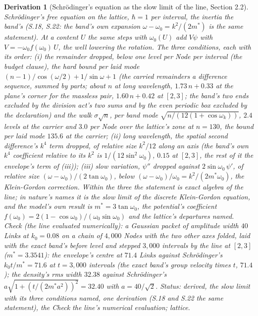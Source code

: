 \documentclass[pdflatex,sn-mathphys-num]{sn-jnl}
\theoremstyle{thmstyleone}
\newtheorem{derivation}{Derivation}
\begin{document}
\begin{derivation}[Schr\"odinger's equation as the slow limit of the line, Section 2.2]
Schr\"odinger's free equation on the lattice, $\hbar = 1$ per interval, the inertia the band's (S.18, S.22: the band's own expansion $\omega - \omega_0 = k^2 / (2m^*)$ is the same statement). At a content $U$ the same steps with $\omega_0(U)$ add $V\psi$ with $V = -\omega_0 f(\omega_0)\,U$, the well lowering the rotation. The three conditions, each with its order: (i) the remainder dropped, below one level per Node per interval (the budget clause), the hard bound per laid mode $(n - 1) / \cos(\omega / 2) + 1 / \sin\omega + 1$ (the carried remainders a difference sequence, summed by parts; about $n$ at long wavelength, $1.73\,n + 0.33$ at the plane's corner for the massless pair, $1.60\,n + 0.42$ at $[2, 3]$; the band's two ends excluded by the division act's two sums and by the even periodic box excluded by the declaration) and the walk $\sigma\sqrt n$, per band mode $\sqrt{n / (12(1 + \cos\omega_k))}$, $2.4$ levels at the carrier and $3.0$ per Node over the lattice's zone at $n = 130$, the bound per laid mode $135.6$ at the carrier; (ii) long wavelength, the spatial second difference's $k^4$ term dropped, of relative size $k^2 / 12$ along an axis (the band's own $k^4$ coefficient relative to its $k^2$ is $1 / (12\sin^2\omega_0)$, $0.15$ at $[2, 3]$, the rest of it the envelope's term of (iii)); (iii) slow variation, $\psi''$ dropped against $2\sin\omega_0\,\psi'$, of relative size $(\omega - \omega_0) / (2\tan\omega_0)$, below $(\omega - \omega_0) / \omega_0 = k^2 / (2m^*\omega_0)$, the Klein-Gordon correction. Within the three the statement is exact algebra of the line; in nature's names it is the slow limit of the discrete Klein-Gordon equation, and the model's own result is $m^* = 3\tan\omega_0$, the potential's coefficient $f(\omega_0) = 2(1 - \cos\omega_0) / (\omega_0\sin\omega_0)$ and the lattice's departures named. \emph{Check} (the line evaluated numerically): a Gaussian packet of amplitude width $40$ Links at $k_0 = 0.08$ on a chain of $4{,}000$ Nodes with the two other axes folded, laid with the exact band's before level and stepped $3{,}000$ intervals by the line at $[2, 3]$ ($m^* = 3.3541$): the envelope's centre at $71.4$ Links against Schr\"odinger's $k_0 t / m^* = 71.6$ at $t = 3{,}000$ intervals (the exact band's group velocity times $t$, $71.4$); the density's rms width $32.38$ against Schr\"odinger's $a\sqrt{1 + (t / (2m^* a^2))^2} = 32.40$ with $a = 40 / \sqrt 2$. \emph{Status:} derived, the slow limit with its three conditions named, one derivation (S.18 and S.22 the same statement), the Check the line's numerical evaluation; lattice.
\end{derivation}
\end{document}
